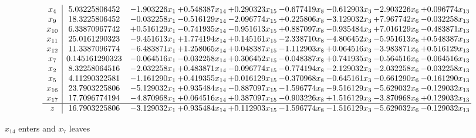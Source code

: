 \documentclass[10pt]{article}
\begin{document}
 \[\begin{array}{c| c c@{\hskip 2pt} c@{\hskip 2pt} c@{\hskip 2pt} c@{\hskip 2pt} c@{\hskip 2pt} c@{\hskip 2pt} c@{\hskip 2pt} }
 x_{4}   &  5.03225806452 & -1.903226 x_{1} & + 0.548387 x_{14} & + 0.290323 x_{15} & -0.677419 x_{8} & -0.612903 x_{3} & -2.903226 x_{6} & + 0.096774 x_{13}\\
 x_{9}   &  18.3225806452 & -0.032258 x_{1} & -0.516129 x_{14} & -2.096774 x_{15} & + 0.225806 x_{8} & -3.129032 x_{3} & + 7.967742 x_{6} & -0.032258 x_{13}\\
 x_{10}   &  6.33870967742 & + 0.516129 x_{1} & -0.741935 x_{14} & -0.951613 x_{15} & + 0.887097 x_{8} & -0.935484 x_{3} & + 7.016129 x_{6} & -0.483871 x_{13}\\
 x_{11}   &  25.0161290323 & -9.451613 x_{1} & + 1.774194 x_{14} & + 0.145161 x_{15} & -2.338710 x_{8} & -4.806452 x_{3} & -5.951613 x_{6} & + 0.548387 x_{13}\\
 x_{12}   &  11.3387096774 & -6.483871 x_{1} & + 1.258065 x_{14} & + 0.048387 x_{15} & -1.112903 x_{8} & + 0.064516 x_{3} & -3.983871 x_{6} & + 0.516129 x_{13}\\
 x_{7}   &  0.145161290323 & -0.064516 x_{1} & -0.032258 x_{14} & + 0.306452 x_{15} & -0.048387 x_{8} & + 0.741935 x_{3} & -0.564516 x_{6} & -0.064516 x_{13}\\
 x_{2}   &  8.32258064516 & -2.032258 x_{1} & + 0.483871 x_{14} & -0.096774 x_{15} & -0.774194 x_{8} & -2.129032 x_{3} & -2.032258 x_{6} & -0.032258 x_{13}\\
 x_{5}   &  4.11290322581 & -1.161290 x_{1} & + 0.419355 x_{14} & + 0.016129 x_{15} & -0.370968 x_{8} & -0.645161 x_{3} & -0.661290 x_{6} & -0.161290 x_{13}\\
 x_{16}   &  23.7903225806 & -5.129032 x_{1} & + 0.935484 x_{14} & -0.887097 x_{15} & -1.596774 x_{8} & -9.516129 x_{3} & -5.629032 x_{6} & -0.129032 x_{13}\\
 x_{17}   &  17.7096774194 & -4.870968 x_{1} & + 0.064516 x_{14} & + 0.387097 x_{15} & -0.903226 x_{8} & + 1.516129 x_{3} & -3.870968 x_{6} & + 0.129032 x_{13}\\
\hline
z    &  16.7903225806 & -3.129032 x_{1} & + 0.935484 x_{14} & + 0.112903 x_{15} & -1.596774 x_{8} & -1.516129 x_{3} & -5.629032 x_{6} & -0.129032 x_{13}\\
\end{array}\]


 $ x_{14} $ enters and $ x_{7} $ leaves 
\end{document}
